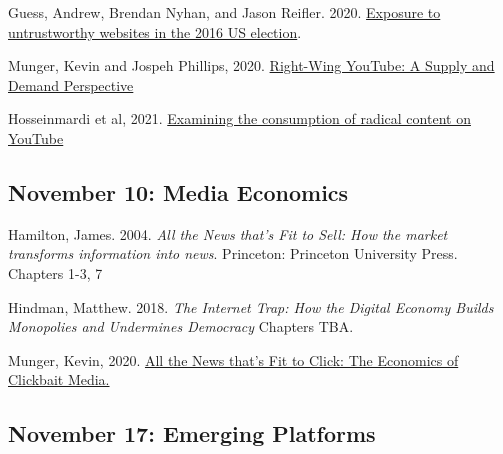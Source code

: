 \vspace{-.1in}\documentclass[11pt]{article}
\begin{document}
\noindent Guess, Andrew, Brendan Nyhan, and Jason Reifler. 2020. \href{https://www.nature.com/articles/s41562-020-0833-x?proof=t}{Exposure to untrustworthy websites in the 2016 US election}.


\noindent Munger, Kevin and Jospeh Phillips, 2020. \href{https://journals.sagepub.com/doi/pdf/10.1177/1940161220964767?casa_token=pNSl7u_rBX0AAAAA:mlH30Wrj5NEIp9nMD459qqBLaUCBlFjwjCwMSGSmd60OIeuomF4XxXH5eBfzk6A3rcmrDE3I9nmK}{Right-Wing YouTube: A Supply and Demand Perspective
}

\noindent Hosseinmardi et al, 2021.  \href{https://www.pnas.org/content/pnas/118/32/e2101967118.full.pdf?casa_token=vI6yIQS3_M8AAAAA:HCt5StQUZ6kzh4X37RqDc0S7qJibnx9wya3wLUZVHjP-Fij7eNUKP1Wb1kpTPFG4k7yvUoRlpdBMEQ}{Examining the consumption of radical content
	on YouTube
}






\subsection*{November 10: Media Economics}

%

\noindent Hamilton, James. 2004. {\it All the News that's Fit to Sell: How the market transforms information into news}. Princeton: Princeton University Press. Chapters 1-3, 7

\noindent Hindman, Matthew. 2018. \textit{The Internet Trap: How the Digital Economy Builds Monopolies and Undermines Democracy} Chapters TBA.


\noindent Munger, Kevin, 2020. \href{https://www.tandfonline.com/doi/pdf/10.1080/10584609.2019.1687626?casa_token=VSjjEXja4EMAAAAA:Q47ASc0lu3itcu7FAjqifqtnrFQvGFvwCJvG9mE1-g7SDLjLNheR6ZtkURoLvRyW7LRFwxmFR0Di}{All the News that's Fit to Click: The Economics of Clickbait Media.}





\subsection*{November 17: Emerging Platforms}
\end{document}
